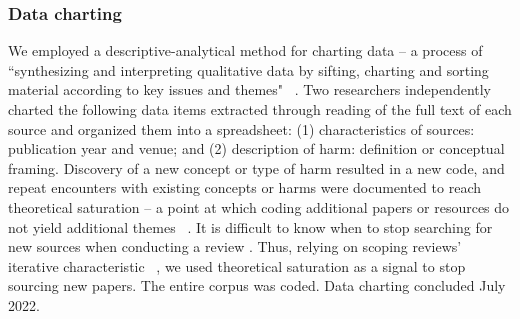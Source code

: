 \subsubsection{Data charting}
We employed a descriptive-analytical method for charting data – a process of “synthesizing and interpreting qualitative data by sifting, charting and sorting material according to key issues and themes" ~\cite[p. 26]{arksey2005scoping}. Two researchers independently charted the following data items extracted through reading of the full text of each source and organized them into a spreadsheet: (1) characteristics of sources: publication year and venue; and (2) description of harm: definition or conceptual framing. Discovery of a new concept or type of harm resulted in a new code, and repeat encounters with existing concepts or harms were documented to reach theoretical saturation – a point at which coding additional papers or resources do not yield additional themes ~\cite{Hennink_Kaiser_Marconi_2017, Saunders_Sim_Kingstone_Baker_Waterfield_Bartlam_Burroughs_Jinks_2018}. It is difficult to know when to stop searching for new sources when conducting a review \cite{hanneke2017scoping}. Thus, relying on scoping reviews' iterative characteristic ~\cite{peters2015guidance}, we used theoretical saturation as a signal to stop sourcing new papers. The entire corpus was coded. Data charting concluded July 2022.  

